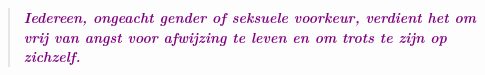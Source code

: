 \documentclass[12pt,openany]{book}
\begin{document}
\begin{figure}[h]
    \centering
\end{figure}

\begin{quote}
\centering
\doublespacing
\textit{\Large \textcolor{purple}{\textbf{Iedereen, ongeacht gender of seksuele voorkeur, verdient het om vrij van angst voor afwijzing te leven en om trots te zijn op zichzelf.}}}
\end{quote}

\newpage
\thispagestyle{empty}

\begin{figure}[h]
    \centering
\end{figure}
\end{document}
